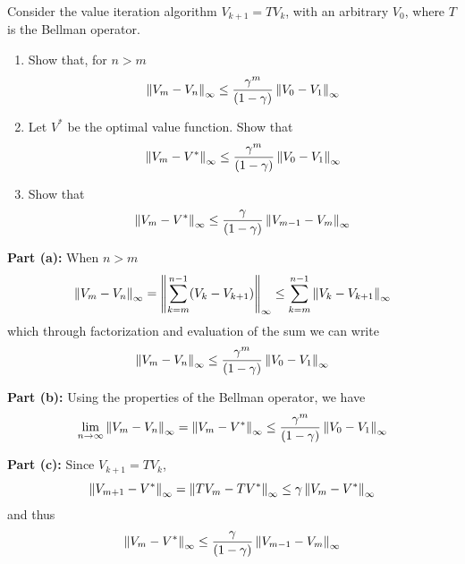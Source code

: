 \documentclass{article}
\begin{document}
\begin{homeworkProblem}

    Consider the value iteration algorithm $V_{k+1} = TV_k$, with an arbitrary $V_0$, where $T$ is the Bellman operator.
    \begin{enumerate}[label=(\alph*), topsep=5pt, itemsep=5pt]
        \item Show that, for $n>m$
              \[
                  \left\lVert V_m - V_n\right\rVert_\infty \leq \frac{\gamma^m}{(1-\gamma)} \left\lVert V_0 - V_1\right\rVert_\infty
              \]
        \item Let $V^*$ be the optimal value function. Show that
              \[
                  \left\lVert V_m - V^*\right\rVert_\infty \leq \frac{\gamma^m}{(1-\gamma)} \left\lVert V_0 - V_1\right\rVert_\infty
              \]
        \item Show that
              \[
                  \left\lVert V_m - V^*\right\rVert_\infty \leq \frac{\gamma}{(1-\gamma)} \left\lVert V_{m-1} - V_m\right\rVert_\infty
              \]
    \end{enumerate}
    \solution

    \textbf{Part (a):} When $n > m$
    \[
        \left\lVert V_m - V_n\right\rVert_\infty = \left\lVert \sum_{k=m}^{n-1} (V_k - V_{k+1}) \right\rVert_\infty \leq \sum_{k=m}^{n-1} \left\lVert V_k - V_{k+1}\right\rVert_\infty
    \]
    which through factorization and evaluation of the sum we can write
    \[
        \left\lVert V_m - V_n\right\rVert_\infty \leq \frac{\gamma^m}{(1-\gamma)} \left\lVert V_0 - V_1\right\rVert_\infty
    \]

    \textbf{Part (b):} Using the properties of the Bellman operator, we have
    \[
        \lim_{n\to\infty} \left\lVert V_m - V_n\right\rVert_\infty = \left\lVert V_m - V^*\right\rVert_\infty \leq \frac{\gamma^m}{(1-\gamma)} \left\lVert V_0 - V_1\right\rVert_\infty
    \]

    \textbf{Part (c):} Since $V_{k+1} = TV_k$,
    \[
        \left\lVert V_{m+1} - V^*\right\rVert_\infty = \left\lVert TV_{m} - TV^*\right\rVert_\infty \leq \gamma \left\lVert V_{m} - V^*\right\rVert_\infty
    \]
    and thus
    \[
        \left\lVert V_{m} - V^*\right\rVert_\infty \leq \frac{\gamma}{(1-\gamma)} \left\lVert V_{m-1} - V_m\right\rVert_\infty
    \]

\end{homeworkProblem}

\pagebreak
\end{document}
